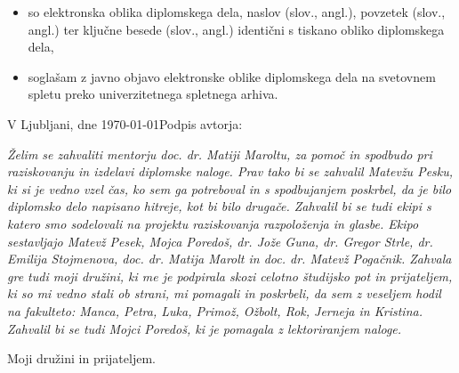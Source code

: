\documentclass[a4paper, 12pt]{book}
\newcommand{\clearemptydoublepage}{\newpage{\pagestyle{empty}\cleardoublepage}}
\begin{document}
{\begin{itemize}
	\item	so elektronska oblika diplomskega dela, naslov (slov., angl.), povzetek (slov., angl.) ter ključne besede (slov., angl.) identični s tiskano obliko diplomskega dela,
	\item soglašam z javno objavo elektronske oblike diplomskega dela na svetovnem spletu preko univerzitetnega spletnega arhiva.	
\end{itemize}

\vspace{1cm}
\noindent V Ljubljani, dne \today \hfill Podpis avtorja:

\clearemptydoublepage

\thispagestyle{empty}\mbox{}\vfill\null\it%
Želim se zahvaliti mentorju doc. dr. Matiji Maroltu, za pomoč in spodbudo pri raziskovanju in izdelavi diplomske naloge. Prav tako bi se zahvalil Matevžu Pesku, ki si je vedno vzel čas, ko sem ga potreboval in s spodbujanjem poskrbel, da je bilo diplomsko delo napisano hitreje, kot bi bilo drugače. Zahvalil bi se tudi ekipi s katero smo sodelovali na projektu raziskovanja razpoloženja in glasbe. Ekipo sestavljajo Matevž Pesek, Mojca Poredoš, dr. Jože Guna, dr. Gregor Strle, dr. Emilija Stojmenova, doc. dr. Matija Marolt in doc. dr. Matevž Pogačnik. Zahvala gre tudi moji družini, ki me je podpirala skozi celotno študijsko pot in prijateljem, ki so mi vedno stali ob strani, mi pomagali in poskrbeli, da sem z veseljem hodil na fakulteto: Manca, Petra, Luka, Primož, Ožbolt, Rok, Jerneja in Kristina. Zahvalil bi se tudi Mojci Poredoš, ki je pomagala z lektoriranjem naloge. 
\rm\normalfont

\clearemptydoublepage

\thispagestyle{empty}\mbox{}{\textheight}\mbox{}\hfill\begin{minipage}{0.55\textwidth}%
Moji družini in prijateljem.
\normalfont\end{minipage}

\clearemptydoublepage

\def\thepage{}%
\tableofcontents{}


\clearemptydoublepage


}
\end{document}

